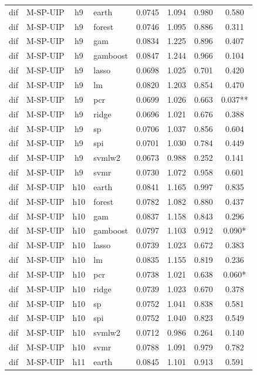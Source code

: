\begin{ThreePartTable}
\begin{longtable}[t]{llclcccc}
\addlinespace
dif & M-SP-UIP & h9 & earth & 0.0745 & 1.094 & 0.980 & 0.580\\
dif & M-SP-UIP & h9 & forest & 0.0746 & 1.095 & 0.886 & 0.311\\
dif & M-SP-UIP & h9 & gam & 0.0834 & 1.225 & 0.896 & 0.407\\
dif & M-SP-UIP & h9 & gamboost & 0.0847 & 1.244 & 0.966 & 0.104\\
dif & M-SP-UIP & h9 & lasso & 0.0698 & 1.025 & 0.701 & 0.420\\
dif & M-SP-UIP & h9 & lm & 0.0820 & 1.203 & 0.854 & 0.470\\
dif & M-SP-UIP & h9 & pcr & 0.0699 & 1.026 & 0.663 & 0.037**\\
dif & M-SP-UIP & h9 & ridge & 0.0696 & 1.021 & 0.676 & 0.388\\
dif & M-SP-UIP & h9 & sp & 0.0706 & 1.037 & 0.856 & 0.604\\
dif & M-SP-UIP & h9 & spi & 0.0701 & 1.030 & 0.784 & 0.449\\
dif & M-SP-UIP & h9 & svmlw2 & 0.0673 & 0.988 & 0.252 & 0.141\\
dif & M-SP-UIP & h9 & svmr & 0.0730 & 1.072 & 0.958 & 0.601\\
\addlinespace
dif & M-SP-UIP & h10 & earth & 0.0841 & 1.165 & 0.997 & 0.835\\
dif & M-SP-UIP & h10 & forest & 0.0782 & 1.082 & 0.880 & 0.437\\
dif & M-SP-UIP & h10 & gam & 0.0837 & 1.158 & 0.843 & 0.296\\
dif & M-SP-UIP & h10 & gamboost & 0.0797 & 1.103 & 0.912 & 0.090*\\
dif & M-SP-UIP & h10 & lasso & 0.0739 & 1.023 & 0.672 & 0.383\\
dif & M-SP-UIP & h10 & lm & 0.0835 & 1.155 & 0.819 & 0.236\\
dif & M-SP-UIP & h10 & pcr & 0.0738 & 1.021 & 0.638 & 0.060*\\
dif & M-SP-UIP & h10 & ridge & 0.0739 & 1.023 & 0.670 & 0.378\\
dif & M-SP-UIP & h10 & sp & 0.0752 & 1.041 & 0.838 & 0.581\\
dif & M-SP-UIP & h10 & spi & 0.0752 & 1.040 & 0.823 & 0.549\\
dif & M-SP-UIP & h10 & svmlw2 & 0.0712 & 0.986 & 0.264 & 0.140\\
dif & M-SP-UIP & h10 & svmr & 0.0788 & 1.091 & 0.979 & 0.782\\
\addlinespace
dif & M-SP-UIP & h11 & earth & 0.0845 & 1.101 & 0.913 & 0.591\\

\end{longtable}
\end{ThreePartTable}

